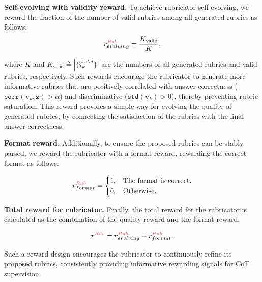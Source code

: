 \textbf{Self-evolving with validity reward.} To achieve rubricator self-evolving, we reward the fraction of the number of valid rubrics among all generated rubrics as follows: 
\begin{equation}
r_{evolving}^{\text{\textcolor{rubricator}{$Rub$}}}=\frac{K_{\text{valid}}}{K},
\end{equation}

where $K$ and $K_{\text{valid}} \triangleq |\{\hat{\tau}^{valid}_k\}|$ are the numbers of all generated rubrics and valid rubrics, respectively. 
Such rewards encourage the rubricator to generate more informative rubrics that are positively correlated with answer correctness (\ie $\mathtt{corr}(\mathbf v_k,\mathbf z)>\alpha$) and discriminative (\ie $\mathtt{std}(\mathbf v_k) > 0$), thereby preventing rubric saturation. 
This reward provides a simple way for evolving the quality of generated rubrics, by connecting the satisfaction of the rubrics with the final answer correctness.

\textbf{Format reward.} Additionally, to ensure the proposed rubrics can be stably parsed, we reward the rubricator with a format reward, rewarding the correct format as follows:

\begin{equation}
    r_{format}^{\text{\textcolor{rubricator}{$Rub$}}}=\begin{cases}
  1, & \text{The format is correct.}\\
  0, & \text{Otherwise.}
\end{cases}
\end{equation}

\textbf{Total reward for rubricator.} Finally, the total reward for the rubricator is calculated as the combination of the quality reward and the format reward:

\begin{equation}
   r^{\text{\textcolor{rubricator}{$Rub$}}} =  r_{evolving}^{\text{\textcolor{rubricator}{$Rub$}}} + r_{format}^{\text{\textcolor{rubricator}{$Rub$}}}.
\end{equation}

Such a reward design encourages the rubricator to continuously refine its proposed rubrics, consistently providing informative rewarding signals for CoT supervision.  

